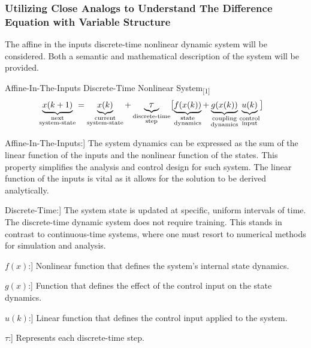 \subsubsection{\centering Utilizing Close Analogs to Understand The Difference Equation with Variable Structure}\label{sec:difference-equation-with-variable-structure}%

The affine in the inputs discrete-time nonlinear dynamic system will be considered.
Both a semantic and mathematical description of the system will be provided.

\begin{definition} Affine-In-The-Inputs Discrete-Time Nonlinear System\textsubscript{[1]}\label{eq:dynamic}
	\begin{equation}
		\begin{aligned}
			\underbrace{x(k+1)}_{\substack{\text{next}                        \\ \text{system-state}}}
			 & = \underbrace{x(k)}_{\substack{\text{current}                  \\ \text{system-state}}}
			+ \underbrace{ \mathlarger{\tau}}_{\substack{\text{discrete-time} \\ \text{step}}}
			\bigl[\underbrace{ f(x(k))}_{\substack{\text{state}               \\ \text{dynamics}}}
			+ \underbrace{ g(x(k))}_{\substack{\text{coupling}                \\ \text{dynamics}}}
			\underbrace{u(k)}_{\substack{\text{control}                       \\ \text{input}}} \bigr]
		\end{aligned}
	\end{equation}
\end{definition}

\begin{description}
	\setlength{\itemsep}{0.35em}
	\item[\makebox[10.5em][l]{Affine-In-The-Inputs:}] The system dynamics can be expressed as the sum of the
	      linear function of the inputs and the nonlinear function of the states.
	      This property simplifies the analysis and control design for such system.
	      The linear function of the inputs is vital as it allows for the solution
	      to be derived analytically.
	\item[\makebox[10.5em][l]{Discrete-Time:}] The system state is updated at specific, uniform intervals of time.
	      The discrete-time dynamic system does not require training.
	      This stands in contrast to continuous-time systems,
	      where one must resort to numerical methods for simulation and analysis.
	\item[\makebox[10.5em][l]{\(f(x)\):}] Nonlinear function that defines the system's internal state dynamics.
	\item[\makebox[10.5em][l]{\(g(x)\):}] Function that defines the effect of the control input on the state dynamics.
	\item[\makebox[10.5em][l]{\(u(k)\):}] Linear function that defines the control input applied to the system.
	\item[\makebox[10.5em][l]{\(\tau\):}] Represents each discrete-time step.
\end{description}



